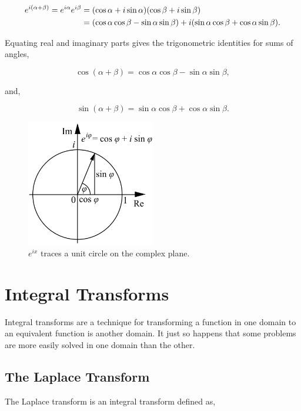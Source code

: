 \documentclass[11pt]{amsart}
\begin{document}
\begin{align}
e^{i(\alpha + \beta)} = e^{i\alpha}e^{i\beta} &= (\cos \alpha + i\sin \alpha)(\cos \beta + i\sin \beta) \notag \\
&= (\cos\alpha\cos\beta - \sin\alpha\sin\beta) + i(\sin\alpha\cos\beta + \cos\alpha\sin\beta).\notag
\end{align}

Equating real and imaginary parts gives the trigonometric identities for sums of angles,

$$\cos (\alpha + \beta) = \cos\alpha\cos\beta - \sin\alpha\sin\beta,$$

and,

$$\sin (\alpha + \beta) = \sin\alpha\cos\beta + \cos\alpha\sin\beta.$$

\begin{figure}[!ht]
\centering
\includegraphics[width=0.5\textwidth]{Figures/eulersformula.png}
\caption{$e^{ix}$ traces a unit circle on the complex plane.\cite{eulerformula}}
\label{fig:eulersformula}
\end{figure}

\section{Integral Transforms}

Integral transforms are a technique for transforming a function in one domain to an equivalent function is another domain. It just so happens that some problems are more easily solved in one domain than the other.

\subsection{The Laplace Transform}

The Laplace transform is an integral transform defined as,
\end{document}
